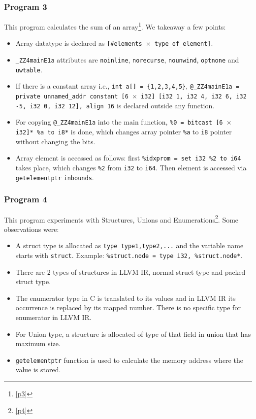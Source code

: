 \documentclass{article}
\begin{document}
\subsubsection{Program 3}
\begin{flushleft}
This program calculates the sum of an array\footnote{\ref{p3}}. We takeaway a few points:
\begin{itemize}
\item Array datatype is declared as \texttt{[\#elements \(\times\) type\_of\_element]}.
\item \texttt{\_ZZ4mainE1a} attributes are \texttt{noinline}, \texttt{norecurse}, \texttt{nounwind}, \texttt{optnone} and \texttt{uwtable}.
\item If there is a constant array i.e., \texttt{int a[] = \{1,2,3,4,5\}}, \texttt{@\_ZZ4mainE1a = private unnamed\_addr constant [6 \(\times\) i32] [i32 1, i32 4, i32 6, i32 -5, i32 0, i32 12], align 16} is declared outside any function.
\item For copying \texttt{@\_ZZ4mainE1a} into the main function, \texttt{\%0 = bitcast [6 \(\times\) i32]* \%a to i8*} is done, which changes array pointer \texttt{\%a} to \texttt{i8} pointer without changing the bits.
\item Array element is accessed as follows: first \texttt{\%idxprom = set i32 \%2 to i64} takes place, which changes \texttt{\%2} from \texttt{i32} to \texttt{i64}. Then element is accessed via \texttt{getelementptr} \texttt{inbounds}.
\end{itemize}
\end{flushleft}

\subsubsection{Program 4}
\begin{flushleft}
This program experiments with Structures, Unions and Enumerations\footnote{\ref{p4}}. Some observations were:
\begin{itemize}
\item A struct type is allocated as \texttt{type {type1,type2,...}} and the variable name starts with \texttt{struct}. Example: \texttt{\%struct.node = type {i32, \%struct.node*}}.
\item There are 2 types of structures in LLVM IR, normal struct type and packed struct type.
\item The enumerator type in C is translated to its values and in LLVM IR its occurrence is replaced by its mapped number. There is no specific type for enumerator in LLVM IR.
\item For Union type, a structure is allocated of type of that field in union that has maximum size.
\item \texttt{getelementptr} function is used to calculate the memory address where the value is stored.
\end{itemize}
\end{flushleft}
\end{document}
